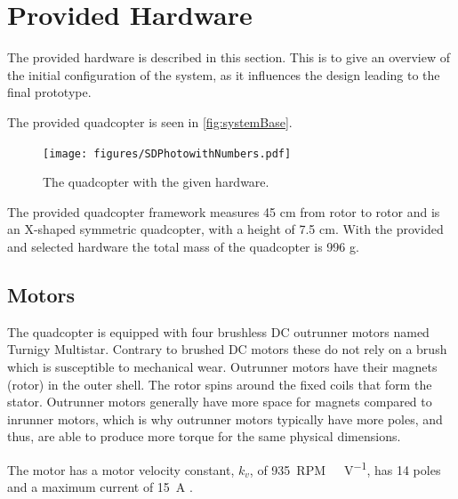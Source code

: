 \section{Provided Hardware}\label{sec:hardware}
The provided hardware is described in this section. This is to give an overview of the initial configuration of the system, as it influences the design leading to the final prototype.


The provided quadcopter is seen in \autoref{fig:systemBase}.
\begin{figure}[H]
  \centering
  \texttt{[image: figures/SDPhotowithNumbers.pdf]}
  \caption{The quadcopter with the given hardware.}
  \label{fig:systemBase}
\end{figure}

The provided quadcopter framework measures 45 cm from rotor to rotor and is an X-shaped symmetric quadcopter, with a height of 7.5 cm. With the provided and selected hardware the total mass of the quadcopter is 996 g.

\subsection{Motors}
The quadcopter is equipped with four brushless DC outrunner motors named Turnigy Multistar. Contrary to brushed DC motors these do not rely on a brush which is susceptible to mechanical wear. Outrunner motors have their magnets (rotor) in the outer shell. The rotor spins around the fixed coils that form the stator. Outrunner motors generally have more space for magnets compared to inrunner motors, which is why outrunner motors typically have more poles, and thus, are able to produce more torque for the same physical dimensions. 

The motor has a motor velocity constant, $k_v$, of \SI{935}{RPM\ V^{-1}}, has 14 poles and a maximum current of \SI{15}{A} \cite{HkingPropeller}.

